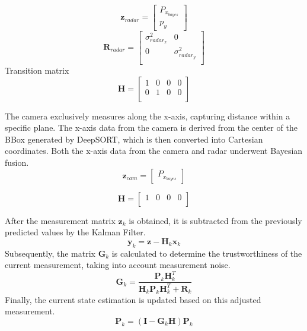 \begin{equation}
    \mathbf{z}_{radar}=
    \begin{bmatrix}
        P_{x_{bayes}} \\ 
        p_y
    \end{bmatrix}
\end{equation}
\begin{equation}\label{equ:2_radar_R_kf}
    \mathbf{R}_{radar} = 
    \begin{bmatrix}
        \sigma_{radar_x}^2 & 0 \\
        0 & \sigma_{radar_y}^2 \\
      \end{bmatrix}
\end{equation}
Transition matrix
\begin{equation}\label{equ:2_radar_transition_matrix}
    \mathbf{H} = 
    \begin{bmatrix}
        1 & 0 & 0 & 0 \\
        0 & 1 & 0 & 0 \\
      \end{bmatrix}
\end{equation}

The camera exclusively measures along the x-axis, capturing distance within a specific plane. 
The x-axis data from the camera is derived from the center of the BBox generated by DeepSORT, 
which is then converted into Cartesian coordinates. 
Both the x-axis data from the camera and radar underwent Bayesian fusion.
\begin{equation}\label{equ:2_z_cam}
    \mathbf{z}_{cam}=
    \begin{bmatrix}P_{x_{bayes}}\end{bmatrix}
\end{equation}

\begin{equation}\label{equ:2_cam_transition_matrix}
    \mathbf{H} = 
    \begin{bmatrix}
        1 & 0 & 0 & 0 \\
      \end{bmatrix}
\end{equation}

After the measurement matrix $\mathbf{z}_k$ is obtained, 
it is subtracted from the previously predicted values by the Kalman Filter. 
\begin{equation}
    \mathbf{y}_{k}=\mathbf{z}-\mathbf{H}_k \mathbf{x}_k
\end{equation}
Subsequently, the matrix $ \mathbf{G}_k $ is calculated to determine the trustworthiness of the current measurement, taking into account measurement noise. 
\begin{equation}
    \mathbf{G}_k = \frac{\mathbf{P}_k \mathbf{H}_k^T}{\mathbf{H}_k\mathbf{P}_k\mathbf{H}_k^T + \mathbf{R}_k}
\end{equation}
Finally, the current state estimation is updated based on this adjusted measurement.
\begin{equation}
    \mathbf{P}_k = (\mathbf{I} - \mathbf{G}_k\mathbf{H})\mathbf{P}_k
\end{equation}